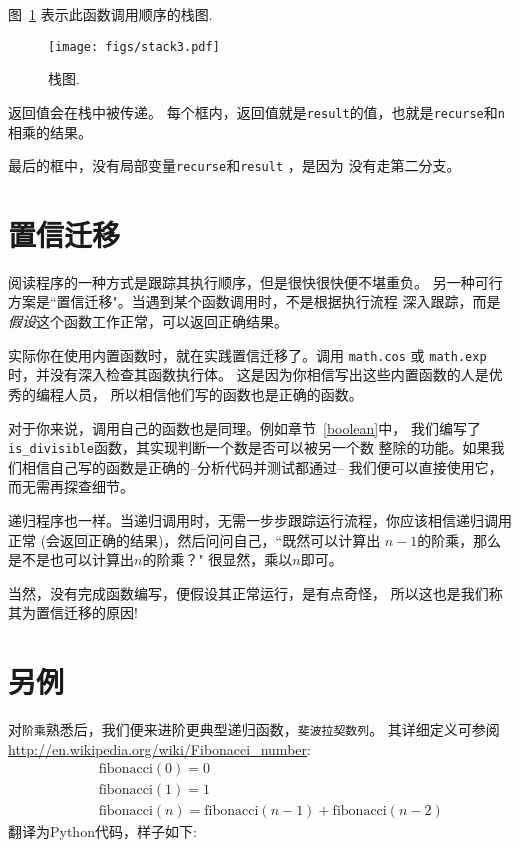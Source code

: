 \documentclass[10pt]{book}
\begin{document}
图~\ref{fig.stack3} 表示此函数调用顺序的栈图.

\begin{figure}
\centerline
{\texttt{[image: figs/stack3.pdf]}}
\caption{栈图.}
\label{fig.stack3}
\end{figure}

返回值会在栈中被传递。
每个框内，返回值就是{\tt result}的值，也就是{\tt recurse}和{\tt n}相乘的结果。

最后的框中，没有局部变量{\tt recurse}和{\tt result} ，是因为
没有走第二分支。

\section{置信迁移}

阅读程序的一种方式是跟踪其执行顺序，但是很快很快便不堪重负。
另一种可行方案是``置信迁移"。当遇到某个函数调用时，不是根据执行流程
深入跟踪，而是{\em 假设}这个函数工作正常，可以返回正确结果。

实际你在使用内置函数时，就在实践置信迁移了。调用
{\tt math.cos} 或 {\tt math.exp}时，并没有深入检查其函数执行体。
这是因为你相信写出这些内置函数的人是优秀的编程人员，
所以相信他们写的函数也是正确的函数。

对于你来说，调用自己的函数也是同理。例如章节~\ref{boolean}中，
我们编写了\verb"is_divisible"函数，其实现判断一个数是否可以被另一个数
整除的功能。如果我们相信自己写的函数是正确的--分析代码并测试都通过--
我们便可以直接使用它，而无需再探查细节。

递归程序也一样。当递归调用时，无需一步步跟踪运行流程，你应该相信递归调用正常
(会返回正确的结果)，然后问问自己，``既然可以计算出 $n-1$的阶乘，那么
是不是也可以计算出$n$的阶乘？" 很显然，乘以$n$即可。

当然，没有完成函数编写，便假设其正常运行，是有点奇怪，
所以这也是我们称其为置信迁移的原因!


\section{另例}
\label{one.more.example}

对{\tt 阶乘}熟悉后，我们便来进阶更典型递归函数，{\tt 斐波拉契数列}。
其详细定义可参阅\url{http://en.wikipedia.org/wiki/Fibonacci_number}:
%
\begin{eqnarray*}
&& \mathrm{fibonacci}(0) = 0 \\
&& \mathrm{fibonacci}(1) = 1 \\
&& \mathrm{fibonacci}(n) = \mathrm{fibonacci}(n-1) + \mathrm{fibonacci}(n-2)
\end{eqnarray*}
%
翻译为Python代码，样子如下:
\end{document}
